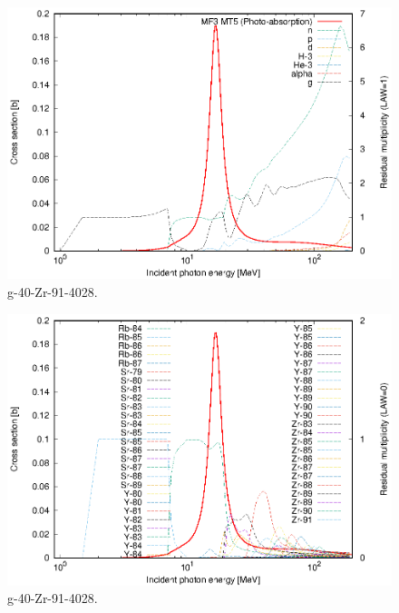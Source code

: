\begin{figure}
 \includegraphics[width=\linewidth]{eps/g_40-Zr-91_4028.eps}
  \caption{g-40-Zr-91-4028.}
\end{figure}
\begin{figure}
 \includegraphics[width=\linewidth]{eps-law0/g_40-Zr-91_4028.eps}
 \caption{g-40-Zr-91-4028.}
\end{figure}
\newpage \clearpage

